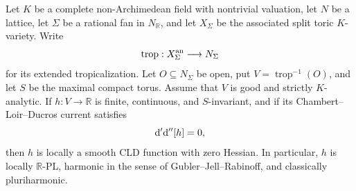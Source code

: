 \begin{proposition}
\label{prop:p062-invariant-split-toric-boundary-zero-current-candidate}
Let $K$ be a complete non-Archimedean field with nontrivial valuation, let
$N$ be a lattice, let $\Sigma$ be a rational fan in $N_{\mathbb R}$, and
let $X_\Sigma$ be the associated split toric $K$-variety.  Write
\[
 \operatorname{trop}:X_\Sigma^{\mathrm{an}}\longrightarrow N_\Sigma
\]
for its extended tropicalization.  Let $O\subseteq N_\Sigma$ be open, put
$V=\operatorname{trop}^{-1}(O)$, and let $S$ be the maximal compact torus.
Assume that $V$ is good and strictly $K$-analytic.
If $h:V\to\mathbb R$ is finite, continuous, and $S$-invariant, and if its
Chambert--Loir--Ducros current satisfies
\[
                         \mathrm d'\mathrm d''[h]=0,
\]
then $h$ is locally a smooth CLD function with zero Hessian.  In particular,
$h$ is locally $\mathbb R$-PL, harmonic in the sense of
Gubler--Jell--Rabinoff, and classically pluriharmonic.
\end{proposition}
